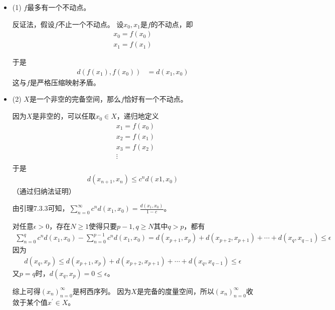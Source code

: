 \documentclass{article}
\begin{document}
\begin{itemize}
  \item (1) $f$最多有一个不动点。

        反证法，假设$f$不止一个不动点。
        设$x_0, x_1$是$f$的不动点，即
        \begin{align*}
          x_0 = f(x_0) \\
          x_1 = f(x_1)
        \end{align*}

        于是
        \begin{align*}
          d(f(x_1), f(x_0)) & = d(x_1, x_0)
        \end{align*}
        这与$f$是严格压缩映射矛盾。

  \item (2) $X$是一个非空的完备空间，那么$f$恰好有一个不动点。

        因为$X$是非空的，可以任取$x_0 \in X$，递归地定义
        \begin{align*}
           & x_1 = f(x_0) \\
           & x_2 = f(x_1) \\
           & x_3 = f(x_2) \\
           & \vdots       \\
        \end{align*}
        于是
        \begin{align*}
          d(x_{n + 1}, x_n) \leq c^n d(x1, x_0)
        \end{align*}
        （通过归纳法证明）

        由引理7.3.3可知，$\sum\limits_{n = 0}^\infty c^n d(x_1, x_0) = \frac{d(x_1, x_0)}{1 - c}$。

        对任意$\epsilon > 0$，存在$N \geq 1$使得只要$p-1, q \geq N$其中$q > p$，都有
        \begin{align*}
          \sum\limits_{n = 0}^q c^n d(x_1, x_0) - \sum\limits_{n = 0}^{p - 1} c^n d(x_1, x_0)
          = d(x_{p+1}, x_p) + d(x_{p+2}, x_{p+1}) + \cdots + d(x_{q}, x_{q-1}) \leq \epsilon
        \end{align*}
        因为
        \begin{align*}
          d(x_q, x_p) \leq d(x_{p+1}, x_p) + d(x_{p+2}, x_{p+1}) + \cdots + d(x_{q}, x_{q-1}) \leq \epsilon
        \end{align*}
        又$p = q$时，$d(x_q, x_p) = 0 \leq \epsilon$。

        综上可得$(x_n)_{n = 0}^\infty$是柯西序列。
        因为$X$是完备的度量空间，所以$(x_n)_{n = 0}^\infty$收敛于某个值$x^\prime \in X$。


\end{itemize}
\end{document}
